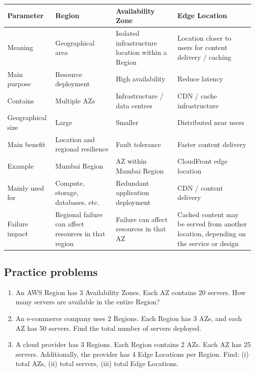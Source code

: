 \documentclass[11pt,a4paper]{article}
\begin{document}
\begin{tabularx}{\textwidth}{@{}lXXX@{}}
\toprule
\rowcolor{tablehead}\textbf{Parameter} & \textbf{Region} & \textbf{Availability Zone} &
  \textbf{Edge Location} \\
\midrule
Meaning & Geographical area & Isolated infrastructure location within a Region & Location
  closer to users for content delivery / caching \\
\addlinespace
Main purpose & Resource deployment & High availability & Reduce latency \\
\addlinespace
Contains & Multiple AZs & Infrastructure / data centres & CDN / cache infrastructure \\
\addlinespace
Geographical size & Large & Smaller & Distributed near users \\
\addlinespace
Main benefit & Location and regional resilience & Fault tolerance & Faster content delivery \\
\addlinespace
Example & Mumbai Region & AZ within Mumbai Region & CloudFront edge location \\
\addlinespace
Mainly used for & Compute, storage, databases, etc. & Redundant application deployment & CDN /
  content delivery \\
\addlinespace
Failure impact & Regional failure can affect resources in that region & Failure can affect
  resources in that AZ & Cached content may be served from another location, depending on the
  service or design \\
\bottomrule
\end{tabularx}

\subsection*{Practice problems}

\begin{enumerate}\itemsep6pt
  \item An AWS Region has 3 Availability Zones. Each AZ contains 20 servers. How many servers
        are available in the entire Region?
  \item An e-commerce company uses 2 Regions. Each Region has 3 AZs, and each AZ has 50
        servers. Find the total number of servers deployed.
  \item A cloud provider has 3 Regions. Each Region contains 2 AZs. Each AZ has 25 servers.
        Additionally, the provider has 4 Edge Locations per Region. Find: (i) total AZs,
        (ii) total servers, (iii) total Edge Locations.
\end{enumerate}
\end{document}
